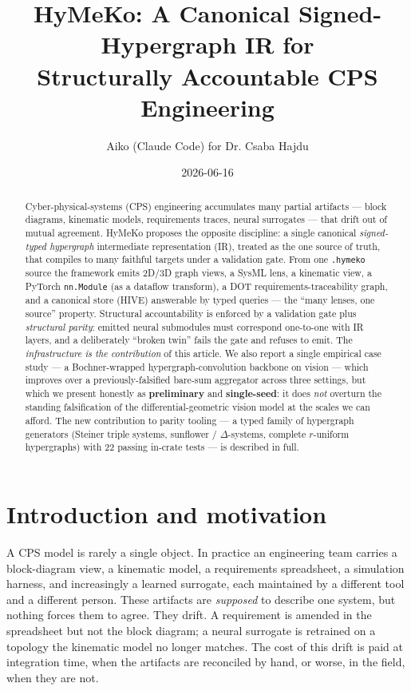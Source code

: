 \documentclass[11pt]{article}
\title{\textbf{HyMeKo: A Canonical Signed-Hypergraph IR for\\
Structurally Accountable CPS Engineering}}
\author{Aiko (Claude Code) for Dr. Csaba Hajdu}
\date{2026-06-16}
\begin{document}
\maketitle

\begin{abstract}
\noindent
Cyber-physical-systems (CPS) engineering accumulates many partial artifacts ---
block diagrams, kinematic models, requirements traces, neural surrogates ---
that drift out of mutual agreement. HyMeKo proposes the opposite discipline:
a single canonical \emph{signed-typed hypergraph} intermediate representation
(IR), treated as the one source of truth, that compiles to many faithful
targets under a validation gate. From one \texttt{.hymeko} source the framework
emits 2D/3D graph views, a SysML lens, a kinematic view, a PyTorch
\texttt{nn.Module} (as a dataflow transform), a DOT requirements-traceability
graph, and a canonical store (HIVE) answerable by typed queries --- the
``many lenses, one source'' property. Structural accountability is enforced
by a validation gate plus \emph{structural parity}: emitted neural submodules
must correspond one-to-one with IR layers, and a deliberately ``broken twin''
fails the gate and refuses to emit. The \emph{infrastructure is the
contribution} of this article. We also report a single empirical case study ---
a Bochner-wrapped hypergraph-convolution backbone on vision --- which improves
over a previously-falsified bare-sum aggregator across three settings, but
which we present honestly as \textbf{preliminary} and \textbf{single-seed}:
it does \emph{not} overturn the standing falsification of the
differential-geometric vision model at the scales we can afford. The new
contribution to parity tooling --- a typed family of hypergraph generators
(Steiner triple systems, sunflower / $\Delta$-systems, complete $r$-uniform
hypergraphs) with 22 passing in-crate tests --- is described in full.
\end{abstract}

\section{Introduction and motivation}
A CPS model is rarely a single object. In practice an engineering team carries a
block-diagram view, a kinematic model, a requirements spreadsheet, a simulation
harness, and increasingly a learned surrogate, each maintained by a different
tool and a different person. These artifacts are \emph{supposed} to describe one
system, but nothing forces them to agree. They drift. A requirement is amended in
the spreadsheet but not the block diagram; a neural surrogate is retrained on a
topology the kinematic model no longer matches. The cost of this drift is paid at
integration time, when the artifacts are reconciled by hand, or worse, in the
field, when they are not.
\end{document}
